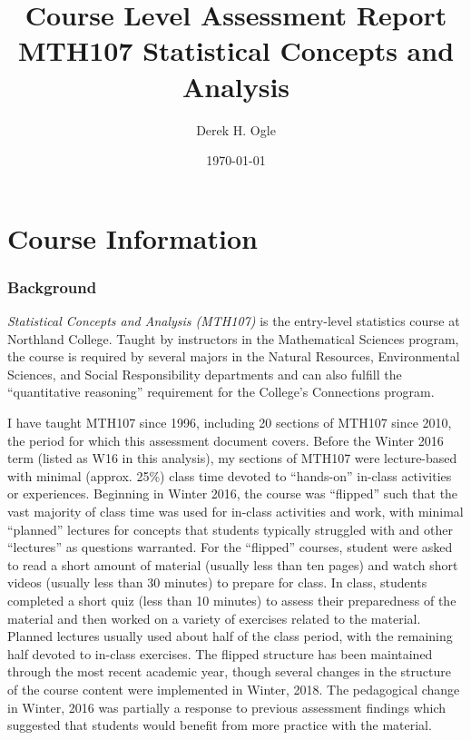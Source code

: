 \documentclass{article}\usepackage[]{graphicx}\usepackage[]{color}
\begin{document}
  \title{Course Level Assessment Report \\ MTH107 Statistical Concepts and Analysis}
  \author{\vspace{-12pt}Derek H. Ogle}
  \date{\vspace{-12pt}\today}
  \maketitle










\section{Course Information}
\subsubsection{Background}
\emph{Statistical Concepts and Analysis (MTH107)} is the entry-level statistics course at Northland College. Taught by instructors in the Mathematical Sciences program, the course is required by several majors in the Natural Resources, Environmental Sciences, and Social Responsibility departments and can also fulfill the ``quantitative reasoning'' requirement for the College's Connections program.

I have taught MTH107 since 1996, including 20 sections of MTH107 since 2010, the period for which this assessment document covers. Before the Winter 2016 term (listed as W16 in this analysis), my sections of MTH107 were lecture-based with minimal (approx. 25\%) class time devoted to ``hands-on'' in-class activities or experiences. Beginning in Winter 2016, the course was ``flipped'' such that the vast majority of class time was used for in-class activities and work, with minimal ``planned'' lectures for concepts that students typically struggled with and other ``lectures'' as questions warranted. For the ``flipped'' courses, student were asked to read a short amount of material (usually less than ten pages) and watch short videos (usually less than 30 minutes) to prepare for class. In class, students completed a short quiz (less than 10 minutes) to assess their preparedness of the material and then worked on a variety of exercises related to the material. Planned lectures usually used about half of the class period, with the remaining half devoted to in-class exercises. The flipped structure has been maintained through the most recent academic year, though several changes in the structure of the course content were implemented in Winter, 2018. The pedagogical change in Winter, 2016 was partially a response to previous assessment findings which suggested that students would benefit from more practice with the material.
\end{document}
